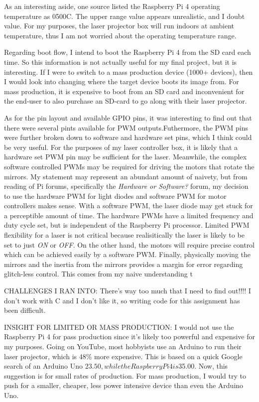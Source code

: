 \documentclass[journal]{IEEEtran}
\begin{document}
    As an interesting aside, one source listed the Raspberry Pi 4 operating temperature as 0\-500C.
    The upper range value appears unrealistic, and I doubt value. 
    For my purposes, the laser projector box will run indoors at ambient temperature, thus I am not worried about the operating temperature range.

    Regarding boot flow, I intend to boot the Raspberry Pi 4 from the SD card each time. 
    So this information is not actually useful for my final project, but it is interesting.
    If I were to switch to a mass production device (1000+ devices), then I would look into changing where the target device boots its image from.
    For mass production, it is expensive to boot from an SD card and inconvenient for the end-user to also purchase an SD-card to go along with their laser projector.
    
    As for the pin layout and available GPIO pins, it was interesting to find out that there were several pints available for PWM outputs.Futhermore, the PWM pins were further broken down to software and hardware set pins, which I think could be very useful.
    For the purposes of my laser controller box, it is likely that a hardware set PWM pin may be sufficient for the laser.
    Meanwhile, the complex software controlled PWMs may be required for driving the motors that rotate the mirrors.
    My statement may represent an abundant amount of naivety, but from reading of Pi forums, specifically the \emph{Hardware or Software?} forum, my decision to use the hardware PWM for light diodes and software PWM for motor controllers makes sense.
    With a software PWM, the laser diode may get stuck for a perceptible amount of time.
    The hardware PWMs have a limited frequency and duty cycle set, but is independent of the Raspberry Pi processor.
    Limited PWM flexibility for a laser is not critical because realisitically the laser is likely to be set to just \emph{ON} or \emph{OFF}.
    On the other hand, the motors will require precise control which can be achieved easily by a software PWM.
    Finally, physically moving the mirrors and the inertia from the mirrors provides a margin for error regarding glitch-less control.
    This comes from my naive understanding t 

    CHALLENGES I RAN INTO: There's way too much that I need to find out!!!! I don't work with C and I don't like it, so writing code for this assignment has been difficult.

    INSIGHT FOR LIMITED OR MASS PRODUCTION: \newline
    I would not use the Raspberry Pi 4 for pass production since it's likely too powerful and expensive for my purposes. 
    Going on YouTube, most hobbyists use an Arduino to run their laser projector, which is 48\% more expensive. 
    This is based on a quick Google search of an Arduino Uno $23.50, while the Raspberry Pi 4 is $35.00. 
    Now, this suggestion is for small rates of production. For mass production, I would try to push for a smaller, cheaper, less power intensive device than even the Arduino Uno.
\end{document}
